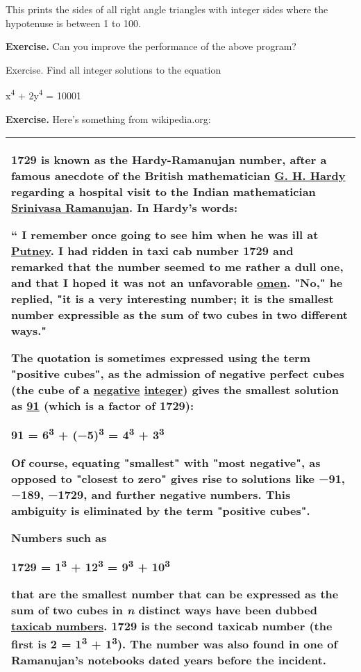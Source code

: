 \documentclass[
]{article}
\begin{document}
This prints the sides of all right angle triangles with integer sides
where the hypotenuse is between 1 to 100.

\textbf{Exercise.} Can you improve the performance of the above program?

Exercise. Find all integer solutions to the equation

x\textsuperscript{4} + 2y\textsuperscript{4} = 10001

\textbf{Exercise. }Here's something from wikipedia.org:

\begin{longtable}[]{@{}l@{}}
\toprule
\endhead
\begin{minipage}[t]{0.97\columnwidth}\raggedright
\textbf{1729} is known as the \textbf{Hardy-Ramanujan number}, after a
famous anecdote of the British mathematician
\href{http://en.wikipedia.org/wiki/G._H._Hardy}{G. H. Hardy} regarding a
hospital visit to the Indian mathematician
\href{http://en.wikipedia.org/wiki/Srinivasa_Ramanujan}{Srinivasa
Ramanujan}. In Hardy's words:

`` I remember once going to see him when he was ill at
\href{http://en.wikipedia.org/wiki/Putney}{Putney}. I had ridden in taxi
cab number 1729 and remarked that the number seemed to me rather a dull
one, and that I hoped it was not an unfavorable
\href{http://en.wikipedia.org/wiki/Omen}{omen}. "No," he replied, "it is
a very interesting number; \textbf{it is the smallest number expressible
as the sum of two cubes in two different ways}."

The quotation is sometimes expressed using the term "positive cubes", as
the admission of negative perfect cubes (the cube of a
\href{http://en.wikipedia.org/wiki/Negative_and_non-negative_numbers}{negative}
\href{http://en.wikipedia.org/wiki/Integer}{integer}) gives the smallest
solution as \href{http://en.wikipedia.org/wiki/91_\%28number\%29}{91}
(which is a factor of 1729):

91 = 6\textsuperscript{3} + (−5)\textsuperscript{3} =
4\textsuperscript{3} + 3\textsuperscript{3}

Of course, equating "smallest" with "most negative", as opposed to
"closest to zero" gives rise to solutions like −91, −189, −1729, and
further negative numbers. This ambiguity is eliminated by the term
"positive cubes".

Numbers such as

1729 = 1\textsuperscript{3} + 12\textsuperscript{3} =
9\textsuperscript{3} + 10\textsuperscript{3}

that are the smallest number that can be expressed as the sum of two
cubes in \emph{n} distinct ways have been dubbed
\href{http://en.wikipedia.org/wiki/Taxicab_number}{taxicab numbers}.
1729 is the second taxicab number (the first is 2 = 1\textsuperscript{3}
+ 1\textsuperscript{3}). The number was also found in one of Ramanujan's
notebooks dated years before the incident.\strut
\end{minipage}\tabularnewline
\bottomrule
\end{longtable}
\end{document}
